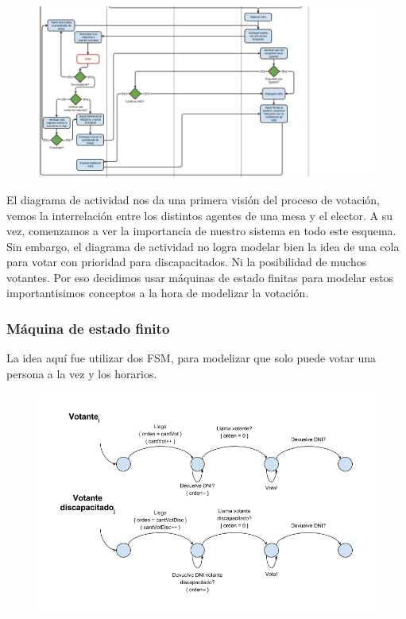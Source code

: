 \begin{figure}[h!]
\centering
\includegraphics[scale=0.5]{imagenes/actividad/actividadSufragio2}
\end{figure}

\newpage

El diagrama de actividad nos da una primera visión del proceso de votación, vemos la interrelación entre los distintos agentes de una mesa y el elector. A su vez, comenzamos a ver la importancia de nuestro sistema en todo este esquema. Sin embargo, el diagrama de actividad no logra modelar bien la idea de una cola para votar con prioridad para discapacitados. Ni la posibilidad de muchos votantes. Por eso decidimos usar máquinas de estado finitas para modelar estos importantisimos conceptos a la hora de modelizar la votación.


\newpage
\subsubsection{Máquina de estado finito}

La idea aquí fue utilizar dos FSM, para modelizar que solo puede votar una persona a la vez y los horarios.

\begin{figure}[h!]
\centering
\includegraphics[scale=0.45]{imagenes/FSMs/Sufragio/Unvotantealavez1}
\end{figure}

